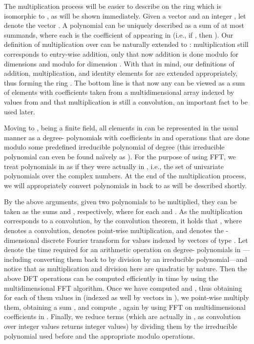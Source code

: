 \documentclass{llncs}
\begin{document}
The multiplication process will be easier to describe on the ring  which is isomorphic to , as will be shown immediately. Given a vector  and an integer , let  denote the vector . A polynomial  can be uniquely described as a sum  of at most  summands, where each  is the coefficient of  appearing in  (i.e.,  if , then ). Our definition of multiplication over  can be naturally extended to : multiplication still corresponds to entry-wise addition, only that now addition is done modulo  for dimensions  and modulo  for dimension . With that in mind, our definitions of addition, multiplication, and identity elements for  are extended appropriately, thus forming the ring . The bottom line is that now any  can be viewed as a sum of elements with coefficients taken from a multidimensional array indexed by values from  and that multiplication is still a convolution, an important fact to be used later.

Moving to , being a finite field, all elements in  can be represented in the usual manner as a degree- polynomials with coefficients in  and operations that are done modulo some predefined irreducible polynomial of degree  (this irreducible polynomial can even be found na\"{\i}vely as ). For the purpose of using FFT,  we treat polynomials in  as if they were actually in , i.e., the set of univariate polynomials over the complex numbers. At the end of the multiplication process, we will appropriately convert polynomials in  back to  as will be described shortly.

By the above arguments, given two polynomials  to be multiplied, they can be taken as the sums  and , respectively, where  for each  and . As the multiplication corresponds to a convolution, by the convolution theorem, it holds that , where  denotes a convolution,  denotes point-wise multiplication, and  denotes the -dimensional discrete Fourier transform for values indexed by vectors of type . 
Let  denote the time required for an arithmetic operation on degree- polynomials in ---including converting them back to  by division by an irreducible polynomial---and notice that  as multiplication and division here are quadratic by nature.
Then the above DFT operations can be computed efficiently in time  by using the multidimensional FFT algorithm.
Once we have computed  and , thus obtaining for each of them  values in  (indexed as well by vectors in ), we point-wise multiply them, obtaining a sum , and compute , again by using FFT on multidimensional coefficients in . Finally, we reduce  terms (which are actually in , as convolution over integer values returns integer values) by dividing them by the irreducible polynomial used before and the appropriate modulo operations. 
 
\end{document}
